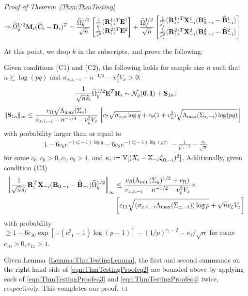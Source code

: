 \documentclass[12pt, letterpaper]{article}
\theoremstyle{definition}
\numberwithin{equation}{section}
\begin{document}
\begin{proof}[Proof of Theorem~\ref{Thm:ThmTesting}]
\begin{align}
\Rightarrow
\widehat \Omega_y^{1/2} {\mathbf{M}}_i ( \widehat {{\mathbf{C}}}_i - {\mathbf{D}}_i)^T &=
\frac{\widehat \Omega_y^{1/2}}{\sqrt n}
\begin{bmatrix}
\frac{1}{\widehat s^1} ({\mathbf{R}}^1_i)^T {\mathbf{E}}^1 \\
\frac{1}{\widehat s^2} ({\mathbf{R}}^2_i)^T {\mathbf{E}}^2
\end{bmatrix} +
\frac{\widehat \Omega_y^{1/2}}{\sqrt n}
\begin{bmatrix}
\frac{1}{\widehat s^1_i} ({\mathbf{R}}^1_i)^T {\mathbf{X}}_{-i}^1 ({\mathbf{B}}_{0,-i}^1 - \widehat {{\mathbf{B}}}_{-i}^1) \\
\frac{1}{\widehat s^2_i} ({\mathbf{R}}^2_i)^T {\mathbf{X}}_{-i}^2 ({\mathbf{B}}_{0,-i}^2 - \widehat {{\mathbf{B}}}_{-i}^2)
\end{bmatrix}\label{eqn:ThmTestingProofeq2}
\end{align}

At this point, we drop $k$ in the subscripts, and prove the following:

\begin{Lemma}\label{Lemma:ThmTestingLemma}
Given conditions (C1) and (C2), the following holds for sample size $n$ such that $n \succsim \log (pq)$ and $\sigma_{x,i,-i} - n^{-1/4} - v_\zeta^2 V_x > 0$:
%
$$
\frac{1}{\sqrt n \widehat s_i}  \widehat \Omega_y^{1/2} {\mathbf{E}}^T {\mathbf{R}}_i \sim
{\cal{N}}_q ({\bf 0}, {\mathbf{I}}) + {\mathbf{S}}_{1n};
$$
%
\begin{align}\label{eqn:ThmTestingProofeq3}
\| {\mathbf{S}}_{1n} \|_\infty & \leq 
\frac{v_\Omega \sqrt{\Lambda_{\max} (\Sigma_e) } }{\sigma_{x,i,-i} - n^{-1/4} - v_\zeta^2 V_x}
\left[ c_7 \sqrt{ \sigma_{x,ii} \log q} +
c_9  (1 + v_\zeta^2) \sqrt{\Lambda_{\max} (\Sigma_{x,-i}) \log (p q)} \right]
\end{align}
%
with probability larger than or equal to
%
\begin{align}\label{eqn:ThmTestingProofeq30}
1 - 6c_6 e^{-(c_7^2-1) \log q} - 6c_8 e^{-(c_9^2-1) \log(p q)} - \frac{1}{p^{\tau_1-2}} - 
\frac{\kappa_i}{\sqrt n}
\end{align}
%
for some $c_6, c_8 >0, c_7, c_9 > 1$, and $\kappa_i := {\mathbb{V}} [(X_i - {\mathbb{X}}_{-i} {\boldsymbol{\zeta}}_{0,-i})^2]$.
%
Additionally, given condition (C3)
%
\begin{align}\label{eqn:ThmTestingProofeq4}
\left\| \frac{1}{\sqrt n \widehat s_i} {\mathbf{R}}_i^T {\mathbf{X}}_{-i} ({\mathbf{B}}_{0,-i} - \widehat {{\mathbf{B}}}_{-i})
\widehat \Omega_y^{1/2} \right\|_\infty & \leq
\frac{v_\beta ( \Lambda_{\min} (\Sigma_y)^{1/2} + v_\Omega)}{\sigma_{x,i,-i} - n^{-1/2} - v_\zeta^2 V_x} \times \notag\\
& \left[ c_{11} \sqrt{ (\sigma_{x,i,-i} \Lambda_{\max} (\Sigma_{x, -i}) ) \log p} + \sqrt n v_\zeta V_x \right]
\end{align}
%
with probability $\geq 1 - 6c_{10} \exp [-(c_{11}^2-1) \log (p-1)] - (1/p)^{\tau_1-2} - \kappa_i/ \sqrt n$ for some $c_{10} >0, c_{11} > 1$.
\end{Lemma}

Given Lemma~\ref{Lemma:ThmTestingLemma}, the first and second summands on the right hand side of \eqref{eqn:ThmTestingProofeq2} are bounded above by applying each of \eqref{eqn:ThmTestingProofeq3} and \eqref{eqn:ThmTestingProofeq4} twice, respectively. This completes our proof.
\end{proof}
\end{document}
